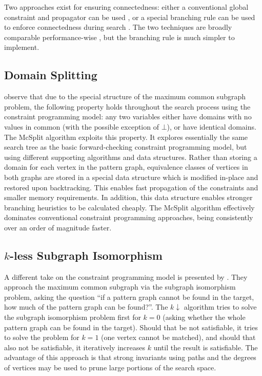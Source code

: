 \documentclass[sigconf]{acmart}
\begin{document}
Two approaches exist for ensuring connectedness: either a conventional global constraint and
propagator can be used \citep{DBLP:conf/cp/McCreeshNPS16}, or a special branching rule can be used
to enforce connectedness during search \citep{DBLP:conf/mco/VismaraV08}. The two techniques are
broadly comparable performance-wise \citep{DBLP:conf/cp/McCreeshNPS16}, but the branching rule is
much simpler to implement.

\subsection{Domain Splitting}

\citet{o:McCreeshPT17} observe that due to the special structure of the maximum common subgraph
problem, the following property holds throughout the search process using the constraint programming
model: any two variables either have domains with no values in common (with the possible exception
of $\bot$), or have identical domains. The McSplit algorithm exploits this property. It explores
essentially the same search tree as the basic forward-checking constraint programming model, but
using different supporting algorithms and data structures.  Rather than storing a domain for each
vertex in the pattern graph, equivalence classes of vertices in both graphs are stored in a special
data structure which is modified in-place and restored upon backtracking. This enables fast
propagation of the constraints and smaller memory requirements. In addition, this data structure
enables stronger branching heuristics to be calculated cheaply. The McSplit algorithm effectively
dominates conventional constraint programming approaches, being consistently over an order of
magnitude faster.

\subsection{$k$-less Subgraph Isomorphism}

A different take on the constraint programming model is presented by
\citet{DBLP:conf/aaai/HoffmannMR17}. They approach the maximum common subgraph via the
subgraph isomorphism problem, asking the question ``if a pattern graph cannot be found in the
target, how much of the pattern graph can be found?''. The $k{\downarrow}$ algorithm tries to solve
the subgraph isomorphism problem first for $k=0$ (asking whether the whole pattern graph can be found in the
target). Should that be not satisfiable, it tries to solve the problem for $k=1$ (one vertex cannot
be matched), and should that also not be satisfiable, it iteratively increases $k$ until the result
is satisfiable. The advantage of this approach is that strong invariants using paths and the degrees
of vertices may be used to prune large portions of the search space.
\end{document}
